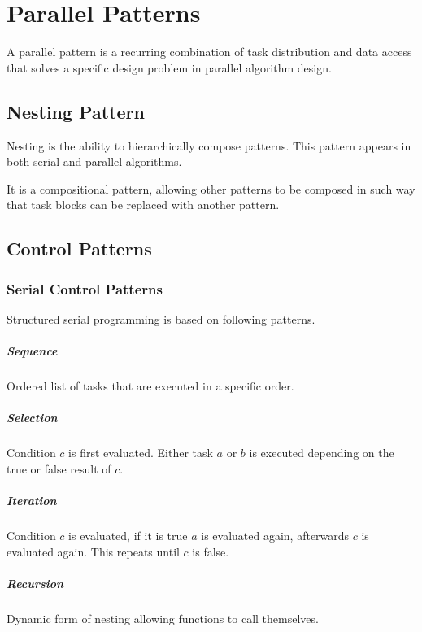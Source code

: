 \chapter{Parallel Patterns}

A parallel pattern is a recurring combination of task distribution and data access that solves a specific design problem in parallel algorithm design.

\section{Nesting Pattern}

Nesting is the ability to hierarchically compose patterns.
This pattern appears in both serial and parallel algorithms.

It is a compositional pattern, allowing other patterns to be composed in such way that task blocks can be replaced with another pattern.

\section{Control Patterns}

\subsection{Serial Control Patterns}

Structured serial programming is based on following patterns.

\paragraph{Sequence}
Ordered list of tasks that are executed in a specific order.

\paragraph{Selection}
Condition $c$ is first evaluated.
Either task $a$ or $b$ is executed depending on the true or false result of $c$.

\paragraph{Iteration}
Condition $c$ is evaluated, if it is true $a$ is evaluated again,
afterwards $c$ is evaluated again.
This repeats until $c$ is false.

\paragraph{Recursion}
Dynamic form of nesting allowing functions to call themselves.

